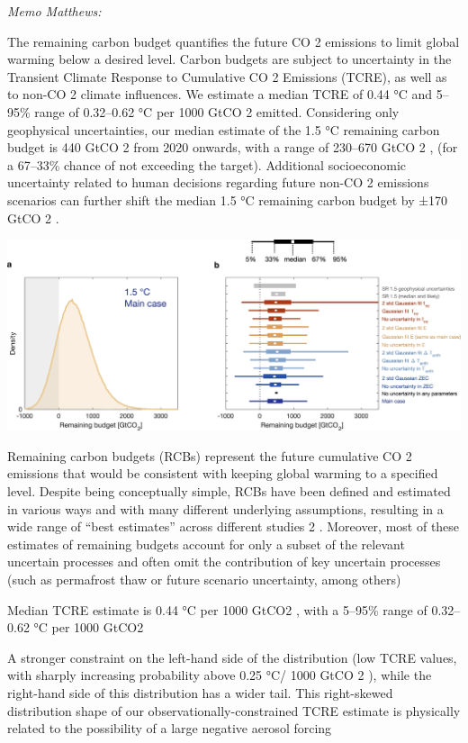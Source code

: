 \documentclass[
]{book}
\begin{document}
\emph{Memo Matthews:}

The remaining carbon budget quantifies the future CO 2 emissions to limit global warming
below a desired level. Carbon budgets are subject to uncertainty in the Transient Climate
Response to Cumulative CO 2 Emissions (TCRE), as well as to non-CO 2 climate influences.
We estimate a median TCRE of 0.44 °C and 5--95\% range of 0.32--0.62 °C per 1000 GtCO 2
emitted. Considering only geophysical uncertainties, our median estimate of the 1.5 °C
remaining carbon budget is 440 GtCO 2 from 2020 onwards, with a range of 230--670
GtCO 2 , (for a 67--33\% chance of not exceeding the target). Additional socioeconomic
uncertainty related to human decisions regarding future non-CO 2 emissions scenarios can
further shift the median 1.5 °C remaining carbon budget by ±170 GtCO 2 .

\includegraphics{fig/carbon_budget.png}

Remaining carbon budgets (RCBs) represent the future
cumulative CO 2 emissions that would be consistent with
keeping global warming to a specified level.
Despite being conceptually simple, RCBs have been
defined and estimated in various ways and with many different
underlying assumptions, resulting in a wide range of
``best estimates'' across different studies 2 . Moreover, most of these
estimates of remaining budgets account for only a subset of the
relevant uncertain processes and often omit the contribution of
key uncertain processes (such as permafrost thaw or future
scenario uncertainty, among others)

Median TCRE estimate is 0.44 °C per 1000 GtCO2 , with a 5--95\%
range of 0.32--0.62 °C per 1000 GtCO2

A stronger constraint on the left-hand side of the distribution (low
TCRE values, with sharply increasing probability above 0.25 °C/
1000 GtCO 2 ), while the right-hand side of this distribution has a
wider tail. This right-skewed distribution shape of our
observationally-constrained TCRE estimate is physically related
to the possibility of a large negative aerosol forcing
\end{document}
